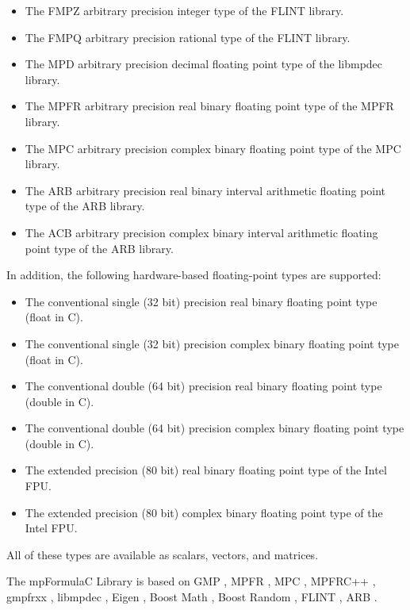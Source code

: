 \begin{itemize}		
	\item The FMPZ arbitrary precision integer type of the FLINT library. 
	\item The FMPQ arbitrary precision rational type of the FLINT library. 
	\item The MPD arbitrary precision decimal floating point type of the libmpdec library. 
	\item The MPFR arbitrary precision real binary floating point type of the MPFR library.
	\item The MPC arbitrary precision complex binary floating point type of the MPC library.
	\item The ARB arbitrary precision real binary interval arithmetic floating point type of the ARB library.
	\item The ACB arbitrary precision complex binary interval arithmetic floating point type of the ARB library.   
\end{itemize}

In addition, the following hardware-based floating-point types are supported:

\begin{itemize}		
	\item The conventional single (32 bit) precision real binary floating point type (float in C).
	\item The conventional single (32 bit) precision complex binary floating point type (float in C).	
	\item The conventional double (64 bit) precision real binary floating point type (double in C).
	\item The conventional double (64 bit) precision complex binary floating point type (double in C).	
	\item The extended precision (80 bit) real binary floating point type of the Intel FPU.
	\item The extended precision (80 bit) complex binary floating point type of the Intel FPU.	
\end{itemize}


All of these types are available as scalars, vectors, and matrices.

\vpara
The mpFormulaC Library is based on GMP \citep{Granlund12}, MPFR \citep{MPFR_2007}, MPC \citep{mpc_2012}, MPFRC++ \citep{Holoborodko2012}, gmpfrxx \citep{Wilkening2008}, libmpdec \citep{mpd_2012}, Eigen \citep{Guennebaud2010}, Boost Math \citep{boost_math}, Boost Random \citep{boost_random}, FLINT \cite{Hart2010}, ARB \cite{arb}.



